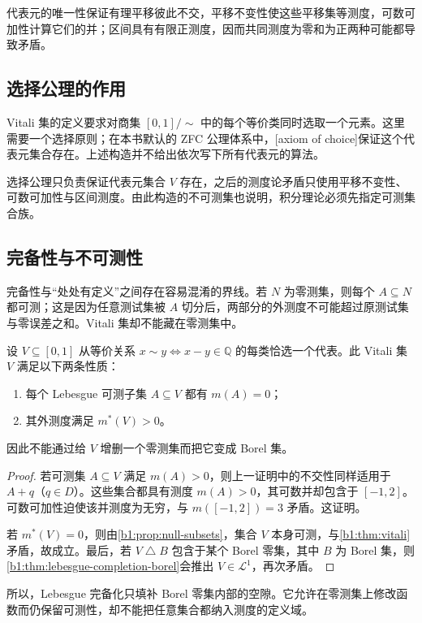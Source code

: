 代表元的唯一性保证有理平移彼此不交，平移不变性使这些平移集等测度，可数可加性计算它们的并；区间具有有限正测度，因而共同测度为零和为正两种可能都导致矛盾。

\subsection{选择公理的作用}
\label{b1:subsec:030502}

Vitali 集的定义要求对商集 \([0,1]/\!\sim\) 中的每个等价类同时选取一个元素。这里需要一个选择原则；在本书默认的 ZFC 公理体系中，[axiom of choice]保证这个代表元集合存在。上述构造并不给出依次写下所有代表元的算法。

\ProseParagraphBreak

选择公理只负责保证代表元集合 \(V\) 存在，之后的测度论矛盾只使用平移不变性、可数可加性与区间测度。由此构造的不可测集也说明，积分理论必须先指定可测集合族。

\subsection{完备性与不可测性}
\label{b1:subsec:030503}

完备性与“处处有定义”之间存在容易混淆的界线。若 \(N\) 为零测集，则每个 \(A\subseteq N\) 都可测；这是因为任意测试集被 \(A\) 切分后，两部分的外测度不可能超过原测试集与零误差之和。Vitali 集却不能藏在零测集中。

\begin{proposition}
\label{b1:prop:vitali-inner-outer}
设 \(V\subseteq[0,1]\) 从等价关系 \(x\sim y\iff x-y\in\mathbb Q\) 的每类恰选一个代表。此 Vitali 集 \(V\) 满足以下两条性质：
\begin{enumerate}
  \item \label{b1:item:0305-vitali-1}每个 Lebesgue 可测子集 \(A\subseteq V\) 都有 \(m(A)=0\)；
  \item \label{b1:item:0305-vitali-2}其外测度满足 \(m^*(V)>0\)。
\end{enumerate}
因此不能通过给 \(V\) 增删一个零测集而把它变成 Borel 集。
\end{proposition}
\begin{proof}
若可测集 \(A\subseteq V\) 满足 \(m(A)>0\)，则上一证明中的不交性同样适用于 \(A+q\)（\(q\in D\)）。这些集合都具有测度 \(m(A)>0\)，其可数并却包含于 \([-1,2]\)。可数可加性迫使该并测度为无穷，与 \(m([-1,2])=3\) 矛盾。这证明。

若 \(m^*(V)=0\)，则由\cref{b1:prop:null-subsets}，集合 \(V\) 本身可测，与\cref{b1:thm:vitali}矛盾，故成立。最后，若 \(V\mathbin{\triangle}B\) 包含于某个 Borel 零集，其中 \(B\) 为 Borel 集，则\cref{b1:thm:lebesgue-completion-borel}会推出 \(V\in\mathcal L^1\)，再次矛盾。
\end{proof}

所以，Lebesgue 完备化只填补 Borel 零集内部的空隙。它允许在零测集上修改函数而仍保留可测性，却不能把任意集合都纳入测度的定义域。
